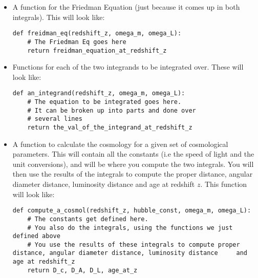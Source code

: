 \documentclass[]{article}
\begin{document}
\begin{itemize}
\item A function for the Friedman Equation (just because it comes up in both integrals). This will look like:
\begin{lstlisting}
def freidman_eq(redshift_z, omega_m, omega_L):
    # The Friedman Eq goes here 
    return freidman_equation_at_redshift_z
\end{lstlisting}

\item Functions for each of the two integrands to be integrated over. These will look like:
\begin{lstlisting}
def an_integrand(redshift_z, omega_m, omega_L):
    # The equation to be integrated goes here.
    # It can be broken up into parts and done over 
    # several lines
    return the_val_of_the_integrand_at_redshift_z
\end{lstlisting}

\item A function to calculate the cosmology for a given set of cosmological parameters. This will contain all the constants (i.e the speed of light and the unit conversions), and will be where you compute the two integrals. You will then use the results of the integrals to compute the proper distance, angular diameter distance, luminosity distance and age at redshift $z$. This function will look like:
\begin{lstlisting}
def compute_a_cosmol(redshift_z, hubble_const, omega_m, omega_L):
    # The constants get defined here.
    # You also do the integrals, using the functions we just defined above
    # You use the results of these integrals to compute proper distance, angular diameter distance, luminosity distance 	and age at redshift_z
    return D_c, D_A, D_L, age_at_z
\end{lstlisting}


\end{itemize}
\end{document}
